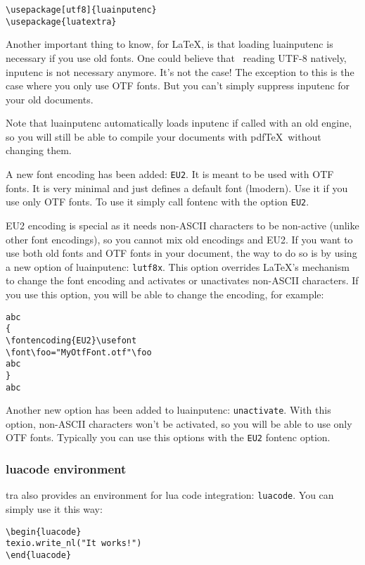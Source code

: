 \documentclass{article}
\newcommand\pf{\textsf}
\newcommand\code{\texttt}
\begin{document}
\begin{verbatim}
\usepackage[utf8]{luainputenc}
\usepackage{luatextra}
\end{verbatim}

Another important thing to know, for \LaTeX , is that loading
\pf{luainputenc} is necessary if you use old fonts. One could believe that
\LuaTeX\ reading UTF-8 natively, \pf{inputenc} is not necessary anymore.
It's not the case! The exception to this is the case where you only use OTF
fonts. But you can't simply suppress \pf{inputenc} for your old documents.

Note that \pf{luainputenc} automatically loads \pf{inputenc} if called
with an old engine, so you will still be able to compile your documents with
pdf\TeX\ without changing them.

A new font encoding has been added: \code{EU2}. It is meant to be used with
OTF fonts. It is very minimal and just defines a default font (lmodern). Use
it if you use only OTF fonts. To use it simply call \pf{fontenc} with the
option \code{EU2}.

EU2 encoding is special as it needs non-ASCII characters to be non-active
(unlike other font encodings), so you cannot mix old encodings and EU2. If you
want to use both old fonts and OTF fonts in your document, the way to do so is
by using a new option of \pf{luainputenc}: \code{lutf8x}. This option
overrides \LaTeX 's mechanism to change the font encoding and activates or
unactivates non-ASCII characters. If you use this option, you will be able to
change the encoding, for example:

\begin{verbatim}
abc
{
\fontencoding{EU2}\usefont
\font\foo="MyOtfFont.otf"\foo
abc
}
abc
\end{verbatim}

Another new option has been added to \pf{luainputenc}:
\code{unactivate}. With this option, non-ASCII characters won't be
activated, so you will be able to use only OTF fonts. Typically you can use
this options with the \code{EU2} \pf{fontenc} option.

\subsubsection{luacode environment}

\LuaTeX tra also provides an environment for lua code integration:
\code{luacode}. You can simply use it this way:

\begin{verbatim}
\begin{luacode}
texio.write_nl("It works!")
\end{luacode}
\end{verbatim}
\end{document}
